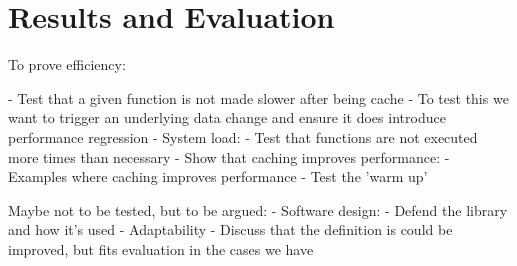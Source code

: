 \chapter{Results and Evaluation}
\label{chapter:results}

To prove efficiency:

- Test that a given function is not made slower after being cache
  - To test this we want to trigger an underlying data change and ensure it does
    introduce performance regression
- System load:
  - Test that functions are not executed more times than necessary
- Show that caching improves performance:
  - Examples where caching improves performance
- Test the 'warm up'

Maybe not to be tested, but to be argued:
- Software design:
  - Defend the library and how it's used
- Adaptability
  - Discuss that the definition is could be improved, but fits evaluation in the cases we have


